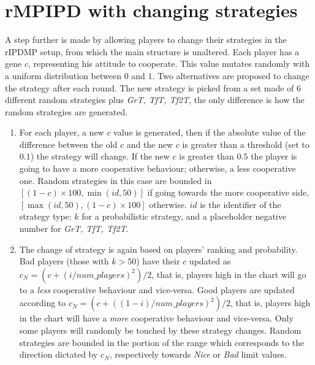 \documentclass[journal,10pt,twoside]{IEEEtran}
\begin{document}
\section{rMPIPD with changing strategies} \label{s:crIPDMP}
A step further is made by allowing players to change their strategies in the rIPDMP setup, from which the main structure is unaltered.
Each player has a gene $c$, representing his attitude to cooperate. This value mutates randomly with a uniform distribution between $0$ and $1$.
Two alternatives are proposed to change the strategy after each round.
The new strategy is picked from a set made of $6$ different random strategies plus \textit{GrT, TfT, Tf2T}, the only difference is how the random strategies are generated.

\begin{enumerate}
    \item For each player, a new $c$ value is generated, then if the absolute value of the difference between the old $c$ and the new $c$ is greater than a threshold (set to $0.1$) the strategy will change. If the new $c$ is greater than $0.5$ the player is going to have a more cooperative behaviour; otherwise, a less cooperative one.
    Random strategies in this case are bounded in 
    $[(1-c)\times 100, \min(id,50)]$ if going towards the more cooperative side, $[\max(id,50), (1-c)\times 100]$ otherwise. $id$ is the identifier of the strategy type: $k$ for a probabilistic strategy, and a placeholder negative number for \textit{GrT, TfT, Tf2T}.

    \item The change of strategy is again based on players' ranking and probability. Bad players (those with $k>50$) have their $c$ updated as
    $c_N = (c+(i/num\_players)^2)/2$, that is, players high in the chart will go to a \textit{less} cooperative behaviour and vice-versa.
    Good players are updated according to $c_N = (c+((1-i)/num\_players)^2)/2$, that is, players high in the chart will have a \textit{more} cooperative behaviour and vice-versa.
    Only some players will randomly be touched by these strategy changes.
    Random strategies are bounded in the portion of the range which corresponds to the direction dictated by $c_N$, respectively towards \textit{Nice} or \textit{Bad} limit values.
\end{enumerate}
\end{document}
